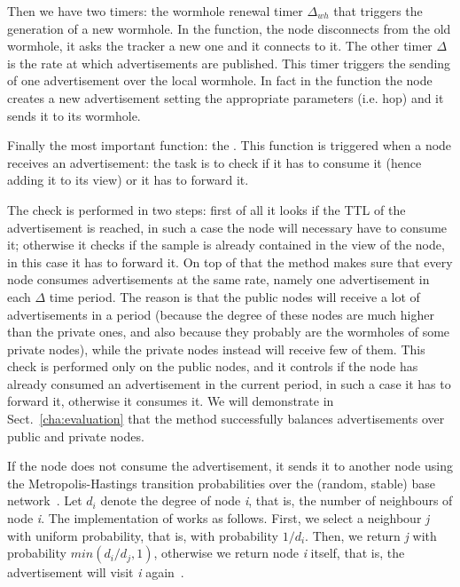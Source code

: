 Then we have two timers: the wormhole renewal timer $\Delta_{wh}$ that triggers the generation of a new wormhole. In the function, the node disconnects from the old wormhole, it asks the tracker a new one and it connects to it. The other timer $\Delta$ is the rate at which advertisements are published. This timer triggers the sending of one advertisement over the local wormhole. In fact in the function the node creates a new advertisement setting the appropriate parameters (i.e. hop) and it sends it to its wormhole.

Finally the most important function: the \receivedAd. This function is triggered when a node receives an advertisement: the task is to check if it has to consume it (hence adding it to its view) or it has to forward it. 

The check is performed in two steps: first of all it looks if the TTL of the advertisement is reached, in such a case the node will necessary have to consume it; otherwise it checks if the sample is already contained in the view of the node, in this case it has to forward it. On top of that the \acceptAd method makes sure that every node consumes advertisements at the same rate, namely one advertisement in each $\Delta$ time period. The reason is that the public nodes will receive a lot of advertisements in a period (because the degree of these nodes are much higher than the private ones, and also because they probably are the wormholes of some private nodes), while the private nodes instead will receive few of them. This check is performed only on the public nodes, and it controls if the node has already consumed an advertisement in the current period, in such a case it has to forward it, otherwise it consumes it. We will demonstrate in Sect.~\ref{cha:evaluation} that the \acceptAd method successfully balances advertisements over public and private nodes.

If the node does not consume the advertisement, it sends it to another node using the Metropolis-Hastings transition probabilities over the (random, stable) base network~\cite{metropolis}.  Let $d_i$ denote the degree of node \textit{i}, that is, the number of neighbours of node \textit{i}. The implementation of \getMetropolisHastingsNeighbour works as follows. First, we select a neighbour \textit{j} with uniform probability, that is, with probability $1/d_i$. Then, we return \textit{j} with probability $min(d_i /d_j , 1)$, otherwise we return node \textit{i} itself, that is, the advertisement will visit \textit{i} again~\cite{wormhole}.

